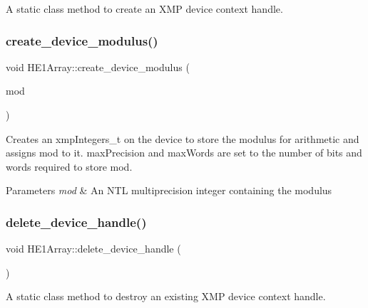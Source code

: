 A static class method to create an X\+MP device context handle. \mbox{\label{classHE1Array_aa57bea5fd5ce8288a868cacc9ec69c90}} 
\subsubsection{\texorpdfstring{create\+\_\+device\+\_\+modulus()}{create\_device\_modulus()}}
{\footnotesize\ttfamily void H\+E1\+Array\+::create\+\_\+device\+\_\+modulus (\begin{DoxyParamCaption}\item[{N\+T\+L\+::\+ZZ \&}]{mod }\end{DoxyParamCaption})\hspace{0.3cm}{\ttfamily [static]}}

Creates an {\ttfamily xmp\+Integers\+\_\+t} on the device to store the modulus for arithmetic and assigns {\ttfamily mod} to it. {\ttfamily max\+Precision} and {\ttfamily max\+Words} are set to the number of bits and words required to store {\ttfamily mod}. 
\begin{DoxyParams}{Parameters}
{\em mod} & An N\+TL multiprecision integer containing the modulus \\
\hline
\end{DoxyParams}
\mbox{\label{classHE1Array_a38ce380d3cdb0dd9e59c0515af87493c}} 
\subsubsection{\texorpdfstring{delete\+\_\+device\+\_\+handle()}{delete\_device\_handle()}}
{\footnotesize\ttfamily void H\+E1\+Array\+::delete\+\_\+device\+\_\+handle (\begin{DoxyParamCaption}{ }\end{DoxyParamCaption})\hspace{0.3cm}{\ttfamily [static]}}

A static class method to destroy an existing X\+MP device context handle. \mbox{\label{classHE1Array_a11536c5066ce8bddb7e8ddf3e9de6146}} 
